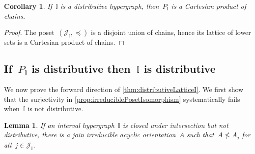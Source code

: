 \documentclass{amsart}
\newtheorem{corollary}[theorem]{Corollary}
\newtheorem{lemma}[theorem]{Lemma}
\theoremstyle{definition}
\newcommand{\cal}[1]{\mathcal{#1}} %
\newcommand{\II}{\mathbb I} %
\newcommand{\cJ}{\cal{J}} %
\begin{document}
\begin{corollary}
If~$\II$ is a distributive hypergraph, then~$P_\II$ is a Cartesian product of chains.
\end{corollary}

\begin{proof}
The poset~$(\cJ_\II, \preccurlyeq)$ is a disjoint union of chains, hence its lattice of lower sets is a Cartesian product of chains.
\end{proof}


\subsection{If~$P_\II$ is distributive then~$\II$ is distributive}
\label{subsec:distributiveLatticeForward}

We now prove the forward direction of \cref{thm:distributiveLatticeI}.
We first show that the surjectivity in \cref{prop:irreduciblePosetIsomorphism} systematically fails when~$\II$ is not distributive.

\begin{lemma}
\label{lem:oneMoreIrreducible}
If an interval hypergraph~$\II$ is closed under intersection but not distributive, there is a join irreducible acyclic orientation~$A$ such that~$A \not\le A_j$ for all~$j \in \cJ_\II$.
\end{lemma}
\end{document}
